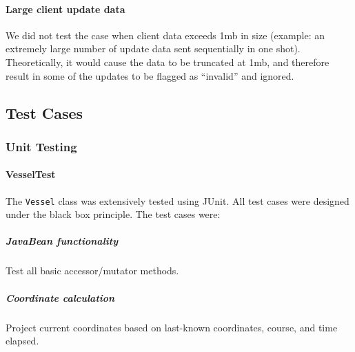 \documentclass{article}
\begin{document}
\paragraph{Large client update data \\}
We did not test the case when client data exceeds 1mb in size (example: an extremely large number of update data sent sequentially in one shot). Theoretically, it would cause the data to be truncated at 1mb, and therefore result in some of the updates to be flagged as ``invalid'' and ignored.

{\color{royalblue}\subsection{Test Cases}}


\subsubsection{Unit Testing} %



\paragraph{VesselTest}

The \verb|Vessel| class was extensively tested using JUnit. All test cases were designed under the black box principle. The test cases were:

\subparagraph{JavaBean functionality \\}
Test all basic accessor/mutator methods.

\subparagraph{Coordinate calculation \\}
Project current coordinates based on last-known coordinates, course, and time elapsed.
\end{document}
